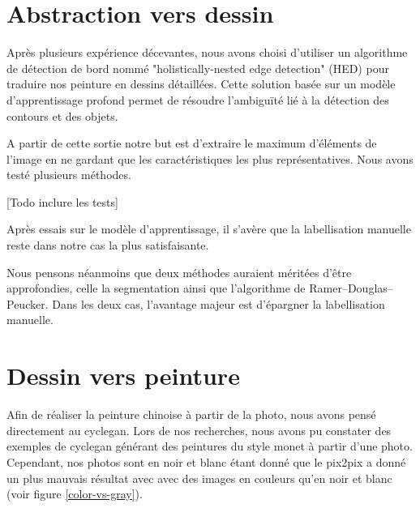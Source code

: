 \documentclass[a4paper, 12pt]{report}
\begin{document}
\section{Abstraction vers dessin}

Après plusieurs expérience décevantes, nous avons choisi d'utiliser un algorithme de détection de bord nommé "holistically-nested edge detection" (HED) pour traduire nos peinture en dessins détaillées. Cette solution basée sur un modèle d'apprentissage profond permet de résoudre l’ambiguïté lié à la détection des contours et des objets.

A partir de cette sortie notre but est d'extraire le maximum d’éléments de l'image en ne gardant que les caractéristiques les plus représentatives. Nous avons testé plusieurs méthodes.

[Todo inclure les tests]

Après essais sur le modèle d'apprentissage, il s'avère que la labellisation manuelle reste dans notre cas la plus satisfaisante.

Nous pensons néanmoins que deux méthodes auraient méritées d'être approfondies, celle la segmentation ainsi que l’algorithme de Ramer–Douglas–Peucker. Dans les deux cas, l'avantage majeur est d'épargner la labellisation manuelle.


\section{Dessin vers peinture}
Afin de réaliser la peinture chinoise à partir de la photo, nous avons pensé directement au cyclegan. Lors de nos recherches, nous avons pu constater des exemples de cyclegan générant des peintures du style monet à partir d'une photo. \\
Cependant, nos photos sont en noir et blanc étant donné que le pix2pix a donné un plus mauvais résultat avec avec des images en couleurs qu'en noir et blanc (voir figure \ref{color-vs-gray}).%
\end{document}
